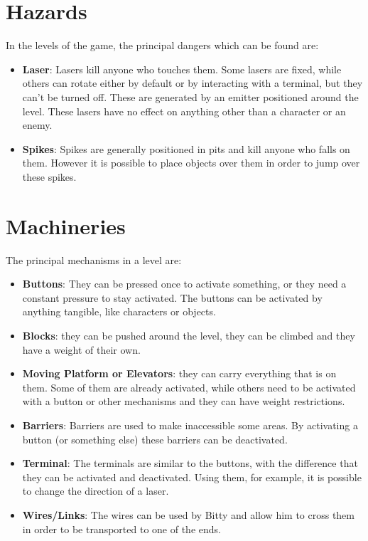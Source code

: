 \documentclass[12pt, a4paper]{report}
\begin{document}
\section*{Hazards}
In the levels of the game, the principal dangers which can be found are:
\begin{itemize}
	\item \textbf{Laser}: Lasers kill anyone who touches them. Some lasers are fixed, while others can rotate either by default or by interacting with a terminal, but they can't be turned off. These are generated by an emitter positioned around the level. These lasers have no effect on anything other than a character or an enemy.
	\item \textbf{Spikes}: Spikes are generally positioned in pits and kill anyone who falls on them. However it is possible to place objects over them in order to jump over these spikes.
\end{itemize}

\section*{Machineries}
The principal mechanisms in a level are:
\begin{itemize}
	\item \textbf{Buttons}: They can be pressed once to activate something, or they need a constant pressure to stay activated. The buttons can be activated by anything tangible, like characters or objects.
	\item \textbf{Blocks}: they can be pushed around the level, they can be climbed and they have a weight of their own.
	\item \textbf{Moving Platform or Elevators}: they can carry everything that is on them. Some of them are already activated, while others need to be activated with a button or other mechanisms and they can have weight restrictions.
	\item \textbf{Barriers}: Barriers are used to make inaccessible some areas. By activating a button (or something else) these barriers can be deactivated.
	\item \textbf{Terminal}: The terminals are similar to the buttons, with the difference that they can be activated and deactivated. Using them, for example, it is possible to change the direction of a laser.
	\item \textbf{Wires/Links}: The wires can be used by Bitty and allow him to cross them in order to be transported to one of the ends.
\end{itemize}
\end{document}
